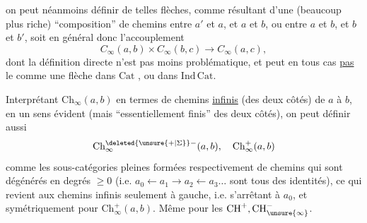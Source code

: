 on peut néanmoins définir de telles flèches, comme résultant d'une   (beaucoup plus riche)  ``composition'' de chemins entre $a'$ et $a$, et $a$ et $b$, ou entre $a$ et $b$, et $b$ et $b'$, soit en général donc l'accouplement
\[
C_{\infty}(a,b)\times C_{\infty}(b,c)\longrightarrow C_{\infty}(a,c),
\]
dont la définition directe n'est pas moins problématique, et  peut en tous cas \uline{pas} le   comme une flèche dans $\mathrm{Cat}$ , ou dans $\mathrm{Ind}\,\mathrm{Cat}$.

 Interprétant    $\mathrm{Ch}_{\infty}(a,b)$ en termes de chemins \uline{infinis} (des deux côtés) de $a$ à $b$, en un sens évident (mais ``essentiellement finis'' des deux côtés), on peut définir aussi
\[
\mathrm{Ch}_{\infty}^{\deleted{\unsure{+|\Sigma}}-}(a,b),\quad\mathrm{Ch}_{\infty}^{+}(a,b)
\]
comme les sous-catégories pleines formées  respectivement de chemins qui sont  dégénérés en degrés $\geq0$ (i.e. $a_0\leftarrow a_1\to a_2\leftarrow a_3\ldots$ sont tous des identités), ce qui revient aux chemins infinis seulement à gauche, i.e. s'arrêtant à $a_0$, et symétriquement pour $\mathrm{Ch}_{\infty}^{+}(a,b)$. Même  pour les $\mathrm{CH}^{+},\mathrm{CH}^{-}_{\unsure{\infty}}$.

